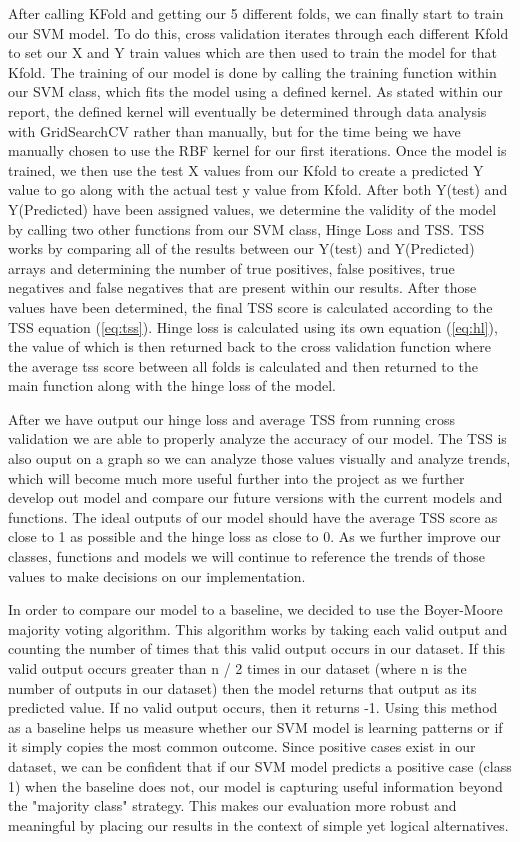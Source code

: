 \documentclass[11pt]{article}
\begin{document}
After calling KFold and getting our 5 different folds, we can finally start to train our SVM model. To do this, cross validation iterates through each different Kfold to set our X and Y train values which are then used to train the model for that Kfold. The training of our model is done by calling the training function within our SVM class, which fits the model using a defined kernel. As stated within our report, the defined kernel will eventually be determined through data analysis with GridSearchCV rather than manually, but for the time being we have manually chosen to use the RBF kernel for our first iterations. Once the model is trained, we then use the test X values from our Kfold to create a predicted Y value to go along with the actual test y value from Kfold. After both Y(test) and Y(Predicted) have been assigned values, we determine the validity of the model by calling two other functions from our SVM class, Hinge Loss and TSS. TSS works by comparing all of the results between our Y(test) and Y(Predicted) arrays and determining the number of true positives, false positives, true negatives and false negatives that are present within our results. After those values have been determined, the final TSS score is calculated according to the TSS equation (\ref{eq:tss}). Hinge loss is calculated using its own equation (\ref{eq:hl}), the value of which is then returned back to the cross validation function where the average tss score between all folds is calculated and then returned to the main function along with the hinge loss of the model. 

After we have output our hinge loss and average TSS from running cross validation we are able to properly analyze the accuracy of our model. The TSS is also ouput on a graph so we can analyze those values visually and analyze trends, which will become much more useful further into the project as we further develop out model and compare our future versions with the current models and functions. The ideal outputs of our model should have the average TSS score as close to 1 as possible and the hinge loss as close to 0. As we further improve our classes, functions and models we will continue to reference the trends of those values to make decisions on our implementation.

In order to compare our model to a baseline, we decided to use the Boyer-Moore majority voting algorithm. This algorithm works by taking each valid output and counting the number of times that this valid output occurs in our dataset. If this valid output occurs greater than n / 2 times in our dataset (where n is the number of outputs in our dataset) then the model returns that output as its predicted value. If no valid output occurs, then it returns -1. Using this method as a baseline helps us measure whether our SVM model is learning patterns or if it simply copies the most common outcome. Since positive cases exist in our dataset, we can be confident that if our SVM model predicts a positive case (class 1) when the baseline does not, our model is capturing useful information beyond the "majority class" strategy. This makes our evaluation more robust and meaningful by placing our results in the context of simple yet logical alternatives.
\end{document}
